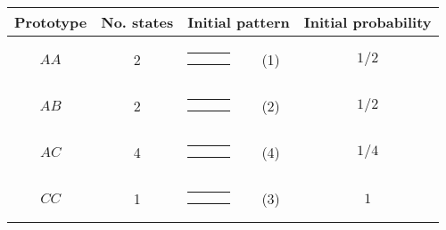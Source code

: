 \begin{center}
\begin{tabular}{ccrlc} \hline
Prototype & No. states & \multicolumn{2}{c}{Initial pattern} & Initial probability \\ \hline
$AA$ & 2 & 
{\renewcommand{\arraystretch}{0.3}
\renewcommand{\tabcolsep}{0.5mm}
\parbox[b][3mm][c]{12mm}{
\begin{tabular}{|p{2mm}|p{2mm}||p{2mm}|} \hline
$\bullet$ &           &           \\
$\bullet$ &           &           \\ \hline
\end{tabular}}}
& (1) & $1/2$ \\
$AB$ & 2 & 
{\renewcommand{\arraystretch}{0.3}
\renewcommand{\tabcolsep}{0.5mm}
\parbox[b][3mm][c]{12mm}{
\begin{tabular}{|p{2mm}|p{2mm}||p{2mm}|} \hline
$\bullet$ &           &           \\
          & $\bullet$ &           \\ \hline
\end{tabular}}}
& (2) & $1/2$ \\
$AC$ & 4 & 
{\renewcommand{\arraystretch}{0.3}
\renewcommand{\tabcolsep}{0.5mm}
\parbox[b][3mm][c]{12mm}{
\begin{tabular}{|p{2mm}|p{2mm}||p{2mm}|} \hline
$\bullet$ &           &           \\
          &           & $\bullet$ \\ \hline
\end{tabular}}}
& (4) & $1/4$ \\
$CC$ & 1 & 
{\renewcommand{\arraystretch}{0.3}
\renewcommand{\tabcolsep}{0.5mm}
\parbox[b][3mm][c]{12mm}{
\begin{tabular}{|p{2mm}|p{2mm}||p{2mm}|} \hline
          &           & $\bullet$ \\
          &           & $\bullet$ \\ \hline
\end{tabular}}}
& (3) & $1$ \\
\hline
\end{tabular}
\end{center}
